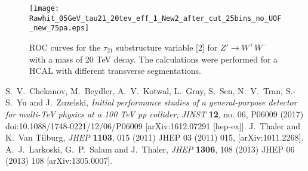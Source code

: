 \documentclass[a4paper]{PoS}
\begin{document}
 \begin{figure}
 \begin{center}
   \begin{minipage}[c]{0.4\textwidth}
     \texttt{[image: Rawhit\_05GeV\_tau21\_20tev\_eff\_1\_New2\_after\_cut\_25bins\_no\_UOF\_new\_75pa.eps]}
   \end{minipage}\hfill
   \begin{minipage}[c]{0.4\textwidth}
     \caption{
        ROC curves for the $\tau_{21}$ substructure variable [2] for  $Z'\rightarrow W^{+}W^{-}$ with 
a mass of 20 TeV decay. The calculations were performed for a HCAL with 
different transverse segmentations.
     } \label{1}
   \end{minipage}
    \end{center}
\end{figure}


\begin{thebibliography}{99}
  S.~V.~Chekanov, M.~Beydler, A.~V.~Kotwal, L.~Gray, S.~Sen, N.~V.~Tran, S.-S.~Yu and J.~Zuzelski,
  \emph{Initial performance studies of a general-purpose detector for multi-TeV physics at a 100 TeV pp collider},
  \emph{JINST} {\bf 12}, no. 06, P06009 (2017)
  doi:10.1088/1748-0221/12/06/P06009
  [arXiv:1612.07291 [hep-ex]].
  J.~Thaler and K.~Van Tilburg,
  \emph{JHEP} {\bf 1103}, 015 (2011)
  JHEP 03 (2011) 015, 
  [arXiv:1011.2268].
  A.~J.~Larkoski, G.~P.~Salam and J.~Thaler,
  \emph{JHEP} {\bf 1306}, 108 (2013)
  JHEP 06 (2013) 108
  [arXiv:1305.0007].

\end{thebibliography}
\end{document}
